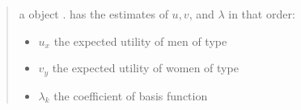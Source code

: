 \documentclass[letterpaper,10pt,english]{sphinxmanual}
\begin{document}
\begin{fulllineitems}
\begin{quote}
\begin{description}
a  object .      has the estimates of \(u, v\),         and \(\lambda\) in that order:
\begin{itemize}
\item {} 
\(u_x\) the expected utility of men of type 

\item {} 
\(v_y\) the expected utility of women of type 

\item {} 
\(\lambda_k\) the coefficient of basis function 

\end{itemize}


\end{description}\end{quote}

\end{fulllineitems}



\renewcommand{\indexname}{Python Module Index}
\begin{sphinxtheindex}
\let\bigletter\sphinxstyleindexlettergroup
\bigletter{e}
\item\relax{}
\indexspace
\bigletter{i}
\item\relax{}
\item\relax{}
\item\relax{}
\end{sphinxtheindex}

\renewcommand{\indexname}{Index}
\printindex
\end{document}
